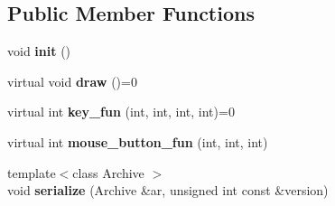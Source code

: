 \subsection*{\-Public \-Member \-Functions}
\begin{DoxyCompactItemize}
\item 
\hypertarget{classNeb_1_1Graphics_1_1GUI_1_1Object_1_1Base_ac519a693981c99f79ee2282c8d5b0be0}{void {\bfseries init} ()}\label{classNeb_1_1Graphics_1_1GUI_1_1Object_1_1Base_ac519a693981c99f79ee2282c8d5b0be0}

\item 
\hypertarget{classNeb_1_1Graphics_1_1GUI_1_1Object_1_1Base_a7b3a61d29962c4a1040b73fefebe3526}{virtual void {\bfseries draw} ()=0}\label{classNeb_1_1Graphics_1_1GUI_1_1Object_1_1Base_a7b3a61d29962c4a1040b73fefebe3526}

\item 
\hypertarget{classNeb_1_1Graphics_1_1GUI_1_1Object_1_1Base_a1f282a18c05e3d8b02e43d91cbe90907}{virtual int {\bfseries key\-\_\-fun} (int, int, int, int)=0}\label{classNeb_1_1Graphics_1_1GUI_1_1Object_1_1Base_a1f282a18c05e3d8b02e43d91cbe90907}

\item 
\hypertarget{classNeb_1_1Graphics_1_1GUI_1_1Object_1_1Base_a1d841f8de73d3edd0402e6e5e58515f7}{virtual int {\bfseries mouse\-\_\-button\-\_\-fun} (int, int, int)}\label{classNeb_1_1Graphics_1_1GUI_1_1Object_1_1Base_a1d841f8de73d3edd0402e6e5e58515f7}

\item 
\hypertarget{classNeb_1_1Graphics_1_1GUI_1_1Object_1_1Base_a554e9ccd33688e8b37b3139114c12b17}{{\footnotesize template$<$class Archive $>$ }\\void {\bfseries serialize} (\-Archive \&ar, unsigned int const \&version)}\label{classNeb_1_1Graphics_1_1GUI_1_1Object_1_1Base_a554e9ccd33688e8b37b3139114c12b17}

\end{DoxyCompactItemize}
